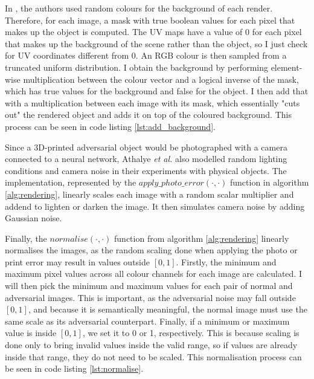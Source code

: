 

In \cite{athalye}, the authors used random colours for the background of each render. Therefore, for each image, a mask with true boolean values for each pixel that makes up the object is computed. The UV maps have a value of 0 for each pixel that makes up the background of the scene rather than the object, so I just check for UV coordinates different from 0. An RGB colour is then sampled from a truncated uniform distribution. I obtain the background by performing element-wise multiplication between the colour vector and a logical inverse of the mask, which has true values for the background and false for the object. I then add that with a multiplication between each image with its mask, which essentially "cuts out" the rendered object and adds it on top of the coloured background. This process can be seen in code listing \ref{lst:add_background}.

Since a 3D-printed adversarial object would be photographed with a camera connected to a neural network, Athalye \textit{et al.} \cite{athalye} also modelled random lighting conditions and camera noise in their experiments with physical objects. The implementation, represented by the $apply\_photo\_error(\cdot, \cdot)$ function in algorithm \ref{alg:rendering}, linearly scales each image with a random scalar multiplier and addend to lighten or darken the image. It then simulates camera noise by adding Gaussian noise.



Finally, the $normalise(\cdot, \cdot)$ function from algorithm \ref{alg:rendering} linearly normalises the images, as the random scaling done when applying the photo or print error may result in values outside $[0, 1]$. Firstly, the minimum and maximum pixel values across all colour channels for each image are calculated. I will then pick the minimum and maximum values for each pair of normal and adversarial images. This is important, as the adversarial noise may fall outside $[0, 1]$, and because it is semantically meaningful, the normal image must use the same scale as its adversarial counterpart. Finally, if a minimum or maximum value is inside $[0, 1]$, we set it to 0 or 1, respectively. This is because scaling is done only to bring invalid values inside the valid range, so if values are already inside that range, they do not need to be scaled. This normalisation process can be seen in code listing \ref{lst:normalise}.


